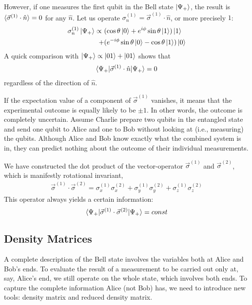 However, if one measures the first qubit in the Bell state $\ket{\Psi_+}$, the result is $\braket{\vec{\sigma}^{(1)}\cdot\hat{n}}=0$ for any $\hat{n}$. Let us operate $\sigma_n^{(1)}=\vec{\sigma}^{(1)}\cdot\hat{n}$, or more precisely $1$: 
\begin{align*}
    \sigma_n^{(1)}\ket{\Psi_+} \propto\ & (\cos\theta\ket{0}+e^{i\phi}\sin\theta\ket{1})\ket{1}\\
    +&(e^{-i\phi}\sin\theta\ket{0}-\cos\theta\ket{1})\ket{0}
\end{align*}
A quick comparison with $\ket{\Psi_+}\propto  \ket{01}+\ket{01}$ shows that
\begin{align*}
    \braket{\Psi_+| \vec{\sigma}^{(1)}\cdot\hat{n} |\Psi_+}=0
\end{align*}
regardless of the direction of $\hat{n}$. 

If the expectation value of a component of $\vec{\sigma}^{(1)}$ vanishes, it means that the experimental outcome is equally likely to be $\pm 1$. In other words, the outcome is completely uncertain. Assume Charlie prepare two qubits in the entangled state and send one qubit to Alice and one to Bob without looking at (i.e., measuring) the qubits. Although Alice and Bob know exactly what the combined system is in, they can predict nothing about the outcome of their individual measurements. 

We have constructed the dot product of the vector-operator $\vec{\sigma}^{(1)}$ and $\vec{\sigma}^{(2)}$, which is manifestly rotational invariant,
\begin{align*}
    \vec{\sigma}^{(1)}\cdot\vec{\sigma}^{(2)}=\sigma_x^{(1)}\sigma_x^{(2)}+\sigma_y^{(1)}\sigma_y^{(2)}+\sigma_z^{(1)}\sigma_z^{(2)}
\end{align*}
This operator always yields a certain information:
\begin{align*}
    \braket{\Psi_+| \vec{\sigma}^{(1)}\cdot\vec{\sigma}^{(2)} |\Psi_+}=const
\end{align*}

\subsection{Density Matrices}
A complete description of the Bell state involves the variables both at Alice and Bob’s ends. To evaluate the result of a measurement to be carried out only at, say, Alice’s end, we still operate on the whole state, which involves both ends. To capture the complete information Alice (not Bob) has, we need to introduce new tools: density matrix and reduced density matrix.

